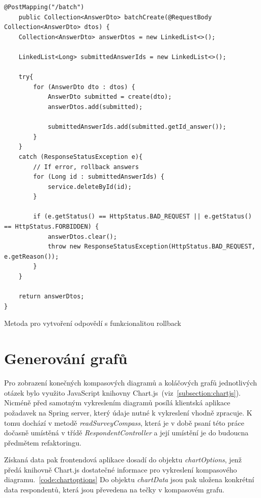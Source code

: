 \begin{listing}[h!]
    \begin{verbatim}
@PostMapping("/batch")
    public Collection<AnswerDto> batchCreate(@RequestBody Collection<AnswerDto> dtos) {
    Collection<AnswerDto> answerDtos = new LinkedList<>();

    LinkedList<Long> submittedAnswerIds = new LinkedList<>();

    try{
        for (AnswerDto dto : dtos) {
            AnswerDto submitted = create(dto);
            answerDtos.add(submitted);

            submittedAnswerIds.add(submitted.getId_answer());
        }
    }
    catch (ResponseStatusException e){
        // If error, rollback answers
        for (Long id : submittedAnswerIds) {
            service.deleteById(id);
        }

        if (e.getStatus() == HttpStatus.BAD_REQUEST || e.getStatus() == HttpStatus.FORBIDDEN) {
            answerDtos.clear();
            throw new ResponseStatusException(HttpStatus.BAD_REQUEST, e.getReason());
        }
    }

    return answerDtos;
}

    \end{verbatim}
\caption{Metoda pro vytvoření odpovědí s funkcionalitou rollback}
\label{code:batchcreate}
\end{listing}

\section{Generování grafů}
Pro zobrazení konečných kompasových diagramů a koláčových grafů jednotlivých otázek 
bylo využito JavaScript knihovny Chart.js~(viz~\ref{subsection:chartjs}). Nicméně před samotným vykreslením diagramů
posílá klientská aplikace požadavek na Spring server, který údaje nutné k vykreslení
vhodně zpracuje. K tomu dochází v metodě \textit{readSurveyCompass}, která je v době psaní této práce dočasně
umístěná v třídě \textit{RespondentController} a její umístění je do budoucna předmětem refaktoringu. 

Získaná data pak frontendová aplikace dosadí do objektu \textit{chartOptions}, jenž předá
knihovně Chart.js dostatečné informace pro vykreslení kompasového diagramu.~\ref{code:chartoptions} Do objektu
\textit{chartData} jsou pak uložena konkrétní data respondentů, která jsou převedena na tečky v kompasovém grafu.

